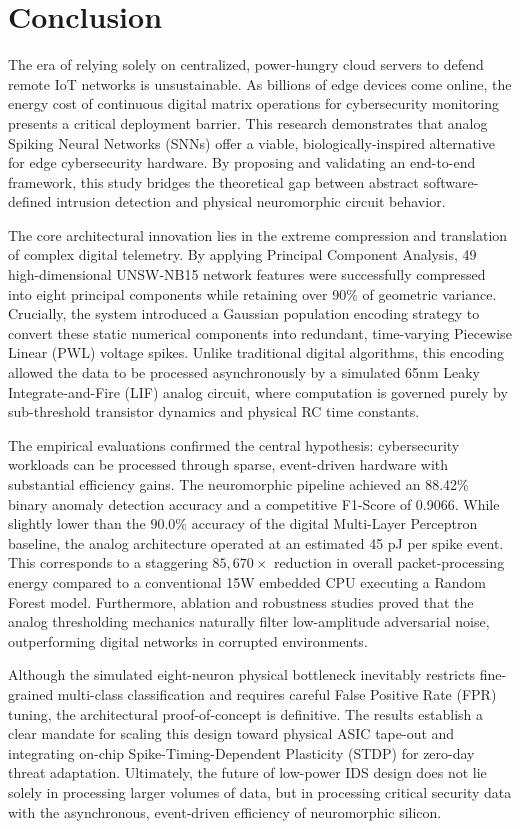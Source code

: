 \documentclass{ieeeaccess}
\begin{document}
\section{Conclusion}
The era of relying solely on centralized, power-hungry cloud servers to defend remote IoT networks is unsustainable. As billions of edge devices come online, the energy cost of continuous digital matrix operations for cybersecurity monitoring presents a critical deployment barrier. This research demonstrates that analog Spiking Neural Networks (SNNs) offer a viable, biologically-inspired alternative for edge cybersecurity hardware. By proposing and validating an end-to-end framework, this study bridges the theoretical gap between abstract software-defined intrusion detection and physical neuromorphic circuit behavior.

The core architectural innovation lies in the extreme compression and translation of complex digital telemetry. By applying Principal Component Analysis, 49 high-dimensional UNSW-NB15 network features were successfully compressed into eight principal components while retaining over 90\% of geometric variance. Crucially, the system introduced a Gaussian population encoding strategy to convert these static numerical components into redundant, time-varying Piecewise Linear (PWL) voltage spikes. Unlike traditional digital algorithms, this encoding allowed the data to be processed asynchronously by a simulated 65nm Leaky Integrate-and-Fire (LIF) analog circuit, where computation is governed purely by sub-threshold transistor dynamics and physical RC time constants. 

The empirical evaluations confirmed the central hypothesis: cybersecurity workloads can be processed through sparse, event-driven hardware with substantial efficiency gains. The neuromorphic pipeline achieved an 88.42\% binary anomaly detection accuracy and a competitive F1-Score of 0.9066. While slightly lower than the $90.0\%$ accuracy of the digital Multi-Layer Perceptron baseline, the analog architecture operated at an estimated 45 pJ per spike event. This corresponds to a staggering $85{,}670\times$ reduction in overall packet-processing energy compared to a conventional 15W embedded CPU executing a Random Forest model. Furthermore, ablation and robustness studies proved that the analog thresholding mechanics naturally filter low-amplitude adversarial noise, outperforming digital networks in corrupted environments.

Although the simulated eight-neuron physical bottleneck inevitably restricts fine-grained multi-class classification and requires careful False Positive Rate (FPR) tuning, the architectural proof-of-concept is definitive. The results establish a clear mandate for scaling this design toward physical ASIC tape-out and integrating on-chip Spike-Timing-Dependent Plasticity (STDP) for zero-day threat adaptation. Ultimately, the future of low-power IDS design does not lie solely in processing larger volumes of data, but in processing critical security data with the asynchronous, event-driven efficiency of neuromorphic silicon.
\end{document}
